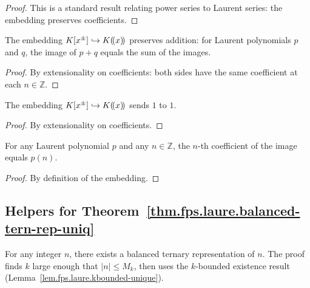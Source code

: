 \begin{proof}
\leanok
This is a standard result relating power series
to Laurent series: the embedding preserves coefficients.
\end{proof}

\begin{lemma}
\label{lem.fps.laure.laupol-embed-add}
\leanhelper
\leanok
The embedding $K[x^{\pm}] \hookrightarrow K(\!(x)\!)$ preserves
addition: for Laurent polynomials $p$ and $q$, the image of $p + q$
equals the sum of the images.
\end{lemma}

\begin{proof}
\leanok
By extensionality on coefficients: both sides have the same coefficient
at each $n \in \mathbb{Z}$.
\end{proof}

\begin{lemma}
\label{lem.fps.laure.laupol-embed-one}
\leanhelper
\leanok
The embedding $K[x^{\pm}] \hookrightarrow K(\!(x)\!)$ sends $1$ to $1$.
\end{lemma}

\begin{proof}
\leanok
By extensionality on coefficients.
\end{proof}

\begin{lemma}
\label{lem.fps.laure.laupol-embed-coeff}
\leanhelper
\leanok
For any Laurent polynomial $p$ and any $n \in \mathbb{Z}$,
the $n$-th coefficient of the image equals $p(n)$.
\end{lemma}

\begin{proof}
\leanok
By definition of the embedding.
\end{proof}

\subsection{Helpers for Theorem~\ref{thm.fps.laure.balanced-tern-rep-uniq}}

\begin{lemma}
\label{lem.fps.laure.bt-exists}
\leanhelper
\leanok
For any integer $n$, there exists a balanced ternary representation
of $n$. The proof finds $k$ large enough that $|n| \le M_k$, then
uses the $k$-bounded existence result
(Lemma~\ref{lem.fps.laure.kbounded-unique}).
\end{lemma}

